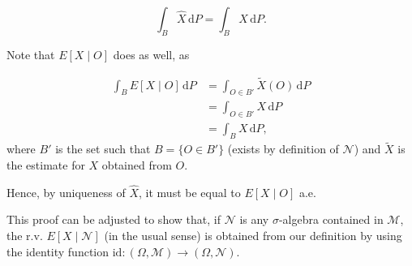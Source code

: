 \documentclass{article}
\newcommand{\M}{\mathcal{M}}
\newcommand{\N}{\mathcal{N}}
\newcommand{\dd}{\,\mathrm{d}}
\newcommand{\id}{\mathrm{id}}
\begin{document}
	\[\int_B \hat X \dd P = \int_B X \dd P.\]
	
	Note that $E[X \mid O]$ does as well, as
	
	\begin{align*}
	\int_B E[X \mid O] \dd P &= \int_{O \in B'} \tilde X(O) \dd P\\
	&= \int_{O \in B'} X \dd P\\
	&= \int_B X \dd P,
	\end{align*}
	where $B'$ is the set such that $B = \{O \in B'\}$ (exists by definition of $\N$) and $\tilde X$ is the estimate for $X$ obtained from $O$.
	
	Hence, by uniqueness of $\hat X$, it must be equal to $E[X \mid O]$ a.e.
	
	\smallskip
	
	This proof can be adjusted to show that, if $\N$ is any $\sigma$-algebra contained in $\M$, the r.v. $E[X \mid \N]$ (in the usual sense) is obtained from our definition by using the identity function $\id : (\Omega, \M) \to (\Omega, \N)$.
\end{document}
